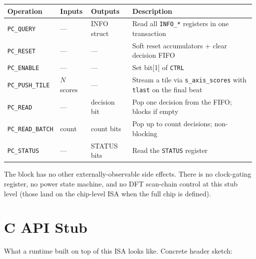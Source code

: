 \documentclass[11pt]{article}
\begin{document}
\begin{table}[h]
\centering
\small
\begin{tabular}{@{}l l l p{6cm}@{}}
\toprule
Operation                & Inputs         & Outputs        & Description \\
\midrule
\texttt{PC\_QUERY}       & ---            & INFO struct    & Read all \texttt{INFO\_*} registers in one transaction \\
\texttt{PC\_RESET}       & ---            & ---            & Soft reset accumulators + clear decision FIFO \\
\texttt{PC\_ENABLE}      & ---            & ---            & Set bit[1] of \texttt{CTRL} \\
\texttt{PC\_PUSH\_TILE}  & $N$ scores     & ---            & Stream a tile via \texttt{s\_axis\_scores} with \texttt{tlast} on the final beat \\
\texttt{PC\_READ}        & ---            & decision bit   & Pop one decision from the FIFO; blocks if empty \\
\texttt{PC\_READ\_BATCH} & count          & count bits     & Pop up to count decisions; non-blocking \\
\texttt{PC\_STATUS}      & ---            & STATUS bits    & Read the \texttt{STATUS} register \\
\bottomrule
\end{tabular}
\end{table}

\noindent
The block has no other externally-observable side effects. There is no
clock-gating register, no power state machine, and no DFT scan-chain control
at this stub level (those land on the chip-level ISA when the full chip is
defined).

\section{C API Stub}
\label{sec:capi}

What a runtime built on top of this ISA looks like. Concrete header sketch:
\end{document}
